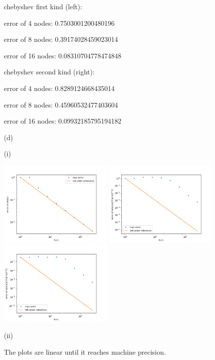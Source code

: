 \documentclass[10pt]{article}
\begin{document}
chebyshev first kind (left): 

error of 4 nodes: 0.7503001200480196

error of 8 nodes: 0.39174028459023014

error of 16 nodes: 0.08310704778474848

chebyshev second kind (right): 

error of 4 nodes: 0.8289124668435014

error of 8 nodes: 0.45960532477403604

error of 16 nodes: 0.09932185795194182

(d)

(i)

\includegraphics[width=2.2in]{p2di1.png}
\includegraphics[width=2.2in]{p2di2.png}
\includegraphics[width=2.2in]{p2di3.png}

(ii)

The plots are linear until it reaches machine precision.
\end{document}
